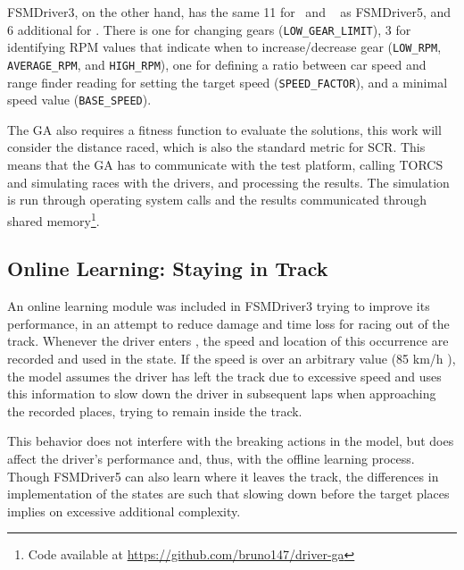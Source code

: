 FSMDriver3, on the other hand, has the same 11 for \OT~and \St~ as FSMDriver5, and 6 additional for \IT. There is one for changing gears (\texttt{LOW\_GEAR\_LIMIT}), 3 for identifying RPM values that indicate when to increase/decrease gear (\texttt{LOW\_RPM}, \texttt{AVERAGE\_RPM}, and \texttt{HIGH\_RPM}), one for defining a ratio between car speed and range finder reading for setting the target speed (\texttt{SPEED\_FACTOR}), and a minimal speed value  (\texttt{BASE\_SPEED}).

The GA also requires a fitness function to evaluate the solutions, this work will consider the distance raced, which is also the standard metric for SCR. This means that the GA has to communicate with the test platform, calling  TORCS and simulating races with the drivers, and processing the results. The simulation is run through operating system calls and the results communicated through shared memory\footnote{Code available at \url{https://github.com/bruno147/driver-ga}}.

\subsection{Online Learning: Staying in Track}%
An online learning module was included in FSMDriver3 trying to improve its performance, in an attempt to reduce damage and time loss for racing out of the track. Whenever the driver enters \OT, the speed and location of this occurrence are recorded and used in the  state. If the speed is over an arbitrary value (85 km/h ), the model assumes the driver has left the track due to excessive speed and uses this information to slow down the driver in subsequent laps when approaching the recorded places, trying to remain inside the track.

This behavior does not interfere with the breaking actions in the model, but does affect the driver's performance and, thus, with the offline learning process. Though FSMDriver5 can also learn where it leaves the track, the differences in implementation of the  states are such that slowing down before the target places implies on excessive additional complexity.